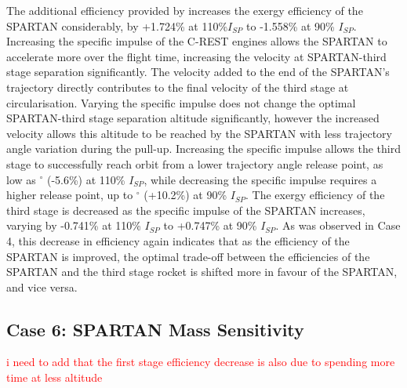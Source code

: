 The additional efficiency provided by increases the exergy efficiency of the SPARTAN considerably, by +1.724\% at 110\%$I_{SP}$ to -1.558\% at 90\% $I_{SP}$. 
Increasing the specific impulse of the C-REST engines allows the SPARTAN to accelerate more over the flight time, increasing the velocity at SPARTAN-third stage separation significantly. The velocity added to the end of the SPARTAN's trajectory directly contributes to the final velocity of the third stage at circularisation. Varying the specific impulse does not change the optimal SPARTAN-third stage separation altitude significantly, however the increased velocity allows this altitude to be reached by the SPARTAN with less trajectory angle variation during the pull-up. Increasing the specific impulse allows the third stage to successfully reach orbit from a lower trajectory angle release point, as low as \secondthirdSeparationgammaIspOneHundredTenNoReturn$^\circ$ (-5.6\%) at 110\% $I_{SP}$, while decreasing the specific impulse requires a higher release point, up to \secondthirdSeparationgammaIspNinetyNoReturn$^\circ$ (+10.2\%) at 90\% $I_{SP}$.
The exergy efficiency of the third stage is decreased as the specific impulse of the SPARTAN increases, varying by -0.741\% at 110\% $I_{SP}$ to +0.747\% at 90\% $I_{SP}$. As was observed in Case 4, this decrease in efficiency again indicates that as the efficiency of the SPARTAN is improved, the optimal trade-off between the efficiencies of the SPARTAN and the third stage rocket is shifted more in favour of the SPARTAN, and vice versa. 


\subsection{Case 6: SPARTAN Mass Sensitivity}\label{sec:SpartanMassnoreturn}

\textcolor{red}{i need to add that the first stage efficiency decrease is also due to spending more time at less altitude}

